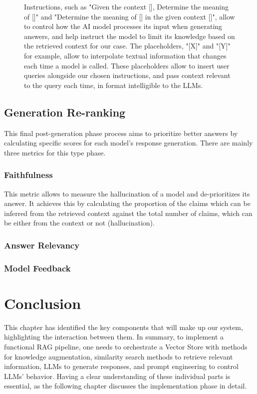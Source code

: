 \begin{figure}[H]
\begin{flushleft}
        Instructions, such as "Given the context [], Determine the meaning of []" and "Determine the meaning of [] in the given context []", allow to control how the AI model processes its input when generating answers, and help instruct the model to limit its knowledge based on the retrieved context for our case.\newline
        The placeholders, "[X]" and "[Y]" for example, allow to interpolate textual information that changes each time a model is called. These placeholders allow to insert user queries alongside our chosen instructions, and pass context relevant to the query each time, in format intelligible to the LLMs.
    \end{flushleft}
\end{figure}
\subsection{Generation Re-ranking}
This final post-generation phase process aims to prioritize better answers by calculating specific scores for each model's response generation. There are mainly three metrics for this type phase.
\subsubsection{Faithfulness}
This metric allows to measure the hallucination of a model and de-prioritizes its answer. It achieves this by calculating the proportion of the claims which can be inferred from the retrieved context against the total number of claims, which can be either from the context or not (hallucination).
\subsubsection{Answer Relevancy}

\subsubsection{Model Feedback}

\section{Conclusion}
This chapter has identified the key components that will make up our system, highlighting the interaction between them. In summary, to implement a functional RAG pipeline, one needs to orchestrate a Vector Store with methods for knowledge augmentation, similarity search methods to retrieve relevant information, LLMs to generate responses, and prompt engineering to control LLMs' behavior.\newline
Having a clear understanding of these individual parts is essential, as the following chapter discusses the implementation phase in detail.